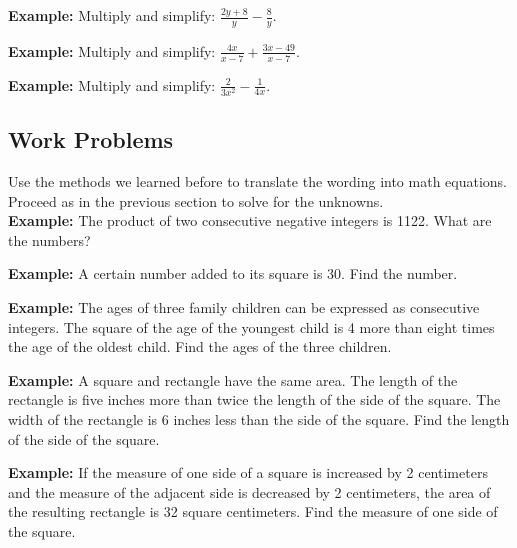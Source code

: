 \documentclass{ximera}
\begin{document}
\vspace{3 cm}

{\bf Example:} Multiply and simplify: $\displaystyle \frac{2y+8}{y} - \frac{8}{y}$.\\

\vspace{3 cm}

{\bf Example:} Multiply and simplify: $\displaystyle \frac{4x}{x-7} + \frac{3x-49}{x-7}$.\\

\vspace{3 cm}

{\bf Example:} Multiply and simplify: $\displaystyle \frac{2}{3x^2} - \frac{1}{4x}$.\\

\vspace{3 cm}


\subsection{Work Problems}

Use the methods we learned before to translate the wording into math equations. Proceed as in the previous section to solve for the unknowns.\\


{\bf Example:} The product of two consecutive negative integers is 1122. What are the numbers?\\
\vspace{3 cm}

{\bf Example:} A certain number added to its square is 30.  Find the number.\\
\vspace{3 cm}

{\bf Example:} The ages of three family children can be expressed as consecutive integers.  The square of the age of the youngest child is 4 more than eight times the age of the oldest child.  Find the ages of the three children.\\
\vspace{3 cm}

{\bf Example:} A square and rectangle have the same area.  The length of the 
rectangle is five inches more than twice the length of the side of the 
square.  The width of the rectangle is 6 inches less than the side of 
the square.  Find the length of the side of the square.\\
\vspace{5 cm}

{\bf Example:} If the measure of one side of a square is increased by 2 centimeters and the measure of the adjacent side is decreased by 2 centimeters, the area of the resulting rectangle is 32 square centimeters.  Find the measure of one side of the square.\\
\end{document}
